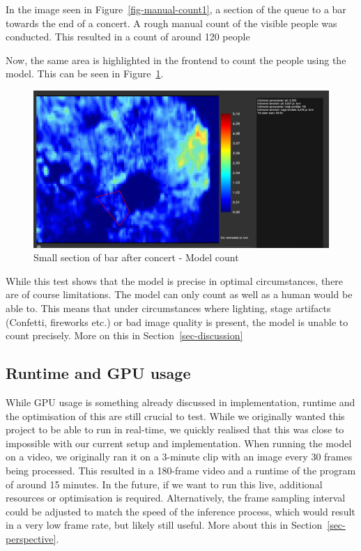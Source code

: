 \documentclass[
]{article}
\begin{document}
In the image seen in Figure~\ref{fig-manual-count1}, a section of the
queue to a bar towards the end of a concert. A rough manual count of the
visible people was conducted. This resulted in a count of around 120
people

Now, the same area is highlighted in the frontend to count the people
using the model. This can be seen in Figure~\ref{fig-count-comparison}.

\begin{figure}

{\centering \includegraphics{../images/count-comparison.png}

}

\caption{\label{fig-count-comparison}Small section of bar after concert
- Model count}

\end{figure}

While this test shows that the model is precise in optimal
circumstances, there are of course limitations. The model can only count
as well as a human would be able to. This means that under circumstances
where lighting, stage artifacts (Confetti, fireworks etc.) or bad image
quality is present, the model is unable to count precisely. More on this
in Section~\ref{sec-discussion}

\hypertarget{sec-runtime}{%
\subsection{Runtime and GPU usage}\label{sec-runtime}}

While GPU usage is something already discussed in implementation,
runtime and the optimisation of this are still crucial to test. While we
originally wanted this project to be able to run in real-time, we
quickly realised that this was close to impossible with our current
setup and implementation. When running the model on a video, we
originally ran it on a 3-minute clip with an image every 30 frames being
processed. This resulted in a 180-frame video and a runtime of the
program of around 15 minutes. In the future, if we want to run this
live, additional resources or optimisation is required. Alternatively,
the frame sampling interval could be adjusted to match the speed of the
inference process, which would result in a very low frame rate, but
likely still useful. More about this in Section~\ref{sec-perspective}.
\end{document}
